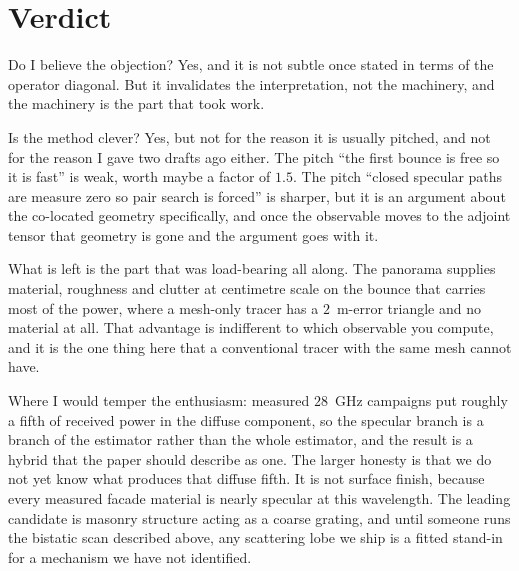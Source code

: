 \documentclass[11pt,a4paper]{article}
\begin{document}
\section{Verdict}

Do I believe the objection? Yes, and it is not subtle once stated in terms of the
operator diagonal. But it invalidates the interpretation, not the machinery, and
the machinery is the part that took work.

Is the method clever? Yes, but not for the reason it is usually pitched, and not
for the reason I gave two drafts ago either. The pitch ``the first bounce is free
so it is fast'' is weak, worth maybe a factor of $1.5$. The pitch ``closed
specular paths are measure zero so pair search is forced'' is sharper, but it is
an argument about the co-located geometry specifically, and once the observable
moves to the adjoint tensor that geometry is gone and the argument goes with it.

What is left is the part that was load-bearing all along. The panorama supplies
material, roughness and clutter at centimetre scale on the bounce that carries
most of the power, where a mesh-only tracer has a $2$~m-error triangle and no
material at all. That advantage is indifferent to which observable you compute,
and it is the one thing here that a conventional tracer with the same mesh cannot
have.

Where I would temper the enthusiasm: measured $28$~GHz campaigns put roughly a
fifth of received power in the diffuse component, so the specular branch is a
branch of the estimator rather than the whole estimator, and the result is a
hybrid that the paper should describe as one. The larger honesty is that we do
not yet know what produces that diffuse fifth. It is not surface finish, because
every measured facade material is nearly specular at this wavelength. The
leading candidate is masonry structure acting as a coarse grating, and until
someone runs the bistatic scan described above, any scattering lobe we ship is a
fitted stand-in for a mechanism we have not identified.
\end{document}
